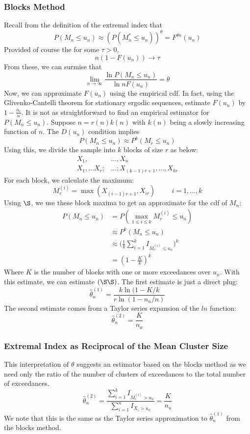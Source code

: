 \documentclass{article}
\theoremstyle{definition}
\theoremstyle{definition}
\begin{document}
\subsubsection{Blocks Method}
Recall from the definition of the extremal index that
\[P(M_n\leq u_n) \approx (P(M^*_n\leq u_n))^\theta= F^{\theta n}(u_n)\]
Provided of course the for some $\tau>0$, 
\[n(1-F(u_n))\rightarrow \tau\]
From these, we can surmise that
\[\lim_{n\rightarrow \infty} \frac{\ln P(M_n\leq u_n)}{\ln nF(u_n)}= \theta\tag{\S\S}\]
Now, we can approximate $F(u_n)$ using the empirical cdf. In fact, using the Glivenko-Cantelli theorem for stationary ergodic sequences, estimate $F(u_n)$ by $1-\frac{n_c}{n}$. It is not as straightforward to find an empirical estimator for $P(M_n\leq u_n)$. Suppose $n=r(n)k(n)$ with $k(n)$ being a slowly increasing function of $n$. The $D(u_n)$ condition implies 
\[P(M_n\leq u_n) \approx P^k(M_r\leq u_n) \tag{\S}\]
Using this, we divide the sample into $k$ blocks of size $r$ as below:
\begin{align*}
    X_1,&\hdots, X_n\\
    X_1, \hdots X_r ;& \hdots ; X_{(k-1)r+1}, \hdots, X_{kr}
\end{align*}
For each block, we calculate the maximum:
\[M_r^{(i)}= \max(X_{(i-1)r+1}, X_{ir} )\hspace{1cm} i=1,\hdots, k\]
Using $\S$, we use these block maxima to get an approximate for the cdf of $M_n$:
\begin{align*}
    P(M_n\leq u_n)&= P(\max_{1\leq i \leq k} M_r^{(i)}\leq u_n)\\
    &\approx P^k(M_n\leq u_n)\\
    &\approx \bigg(\frac{1}{k} \sum_{i=1}^k I_{M_r^{(i)}\leq u_n}\bigg)^k\\
    &=(1-\frac{K}{k})^k
\end{align*}
Where $K$ is the number of blocks with one or more exceedances over $u_n$. With this estimate, we can estimate $(\S\S)$. The first estimate is just a direct plug:
\[\hat{\theta}_n^{(1)}= \frac{k\ln(1-K/k}{r\ln(1-n_u/n)}\]
The second estimate comes from a Taylor series expansion of the $ln$ function:
\[\hat{\theta}_n^{(2)}= \frac{K}{n_u}\]


\subsubsection{Extremal Index as Reciprocal of the Mean Cluster Size}
This interpretation of $\theta$ suggests an estimator based on the blocks method as we need only the ratio of the number of clusters of exceedances to the total number of exceedances. 
\[\hat{\theta}_n^{(2)}= \frac{\sum_{i=1}^k I_{M_r^{(i)}>u_n}}{\sum_{i=1}^n I_{X_i>u_n}}= \frac{K}{n_u}\]
We note that this is the same as the Taylor series approximation to $\hat{\theta}_n^{(1)}$ from the blocks method.
\end{document}
